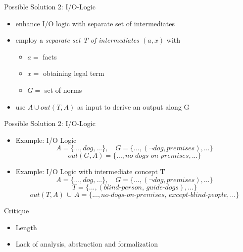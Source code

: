 \documentclass[]{beamer}
\begin{document}

\begin{frame}{Possible Solution 2: I/O-Logic}
    \begin{itemize}
        \item enhance I/O logic with separate set of intermediates
        \item employ a \emph{separate set T of intermediates $(a,x)$} with
        \begin{itemize}
            \item $a =$ facts
            \item $x =$ obtaining legal term
            \item $G =$ set of norms
        \end{itemize}
        \item use $A \cup out(T,A)$ as input to derive an output along G
    \end{itemize}
\end{frame}

\begin{frame}{Possible Solution 2: I/O-Logic}
    \begin{itemize}
        \item Example: I/O Logic
        \[A = \{..., \mathit{dog},...\},\quad G = \{...,(\mathit{\neg{dog}},\mathit{premises}),...\}\]
        \[\mathit{out}(G,A) = \{...,\textit{no-dogs-on-premises},...\}\]
        \pause
        \item Example: I/O Logic with intermediate concept T
        \[A = \{..., \mathit{dog},...\},\quad G = \{...,(\mathit{\neg{dog}},\mathit{premises}),...\}\]
        \[T = \{...,(\textit{blind-person, guide-dogs}),...\}\]
        \[\mathit{out}(T,A) \, \cup \, A = \{...,\textit{no-dogs-on-premises, except-blind-people},...\}\]
    \end{itemize}
\end{frame}

\begin{frame}{Critique}
    \begin{itemize}
        \item Length
        \item Lack of analysis, abstraction and formalization
    \end{itemize}
\end{frame}
\end{document}
